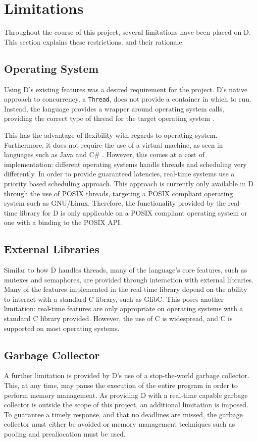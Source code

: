 \section{Limitations} %
Throughout the course of this project, several limitations have been placed on 
D. 
This section explains these restrictions, and their rationale.
\subsection{Operating System}
Using D's existing features was a desired requirement for the project. 
D's native approach to concurrency, a \texttt{Thread}, does not provide a
container in which to run. 
Instead, the language provides a wrapper around operating system calls, 
providing the correct type of thread for the target operating system
\cite{github-core-thread}. 
\par\bigskip\noindent
This has the advantage of flexibility with regards to operating system.
Furthermore, it does not require the use of a virtual machine, as seen in languages such as 
Java and C\# \cite{zhang2007exploiting}. However, this comes at a cost of implementation: 
different operating systems handle threads and scheduling very differently. 
In order to provide guaranteed latencies, real-time systems use a priority based 
scheduling approach. This approach is currently only available in D through the use of 
POSIX threads, targeting a POSIX compliant operating system such as GNU/Linux. 
Therefore, the functionality provided by the real-time library for D is only 
applicable on a POSIX compliant operating system or one with a binding to the POSIX 
API.

\subsection{External Libraries}

Similar to how D handles threads, many of the language's core features, such as 
mutexes and semaphores, are provided through interaction with external libraries. 
Many of the features implemented in the real-time library depend on the ability 
to interact with a standard C library, such as GlibC. This poses another
limitation: real-time features are only appropriate on operating systems with 
a standard C library provided. However, the use of C is widespread, and C is 
supported on most operating systems. 

\subsection{Garbage Collector}
A further limitation is provided by D's use of a stop-the-world garbage collector. 
This, at any time, may pause the execution of the entire program in 
order to perform memory management. As providing D with a real-time capable 
garbage collector is outside the scope of this project, an additional limitation 
is imposed. To guarantee a timely response, and that no 
deadlines are missed, the garbage collector must either be avoided or memory 
management techniques such as pooling and preallocation must be used. 

